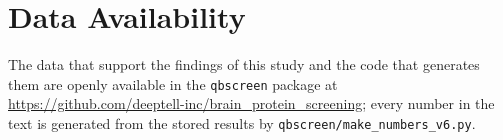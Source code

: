 \documentclass[aip,jcp,amsmath,amssymb,reprint]{revtex4-1}
\begin{document}
\section*{Data Availability}
The data that support the findings of this study and the code that generates
them are openly available in the \texttt{qbscreen} package at
\url{https://github.com/deeptell-inc/brain_protein_screening}; every number in
the text is generated from the stored results by
\texttt{qbscreen/make\_numbers\_v6.py}.


\end{document}
